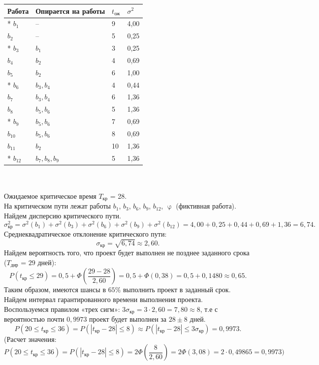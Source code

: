 \documentclass[a4paper, 12pt]{report}
\renewcommand{\leq}{\leqslant}
\renewcommand{\varphi}{\upvarphi}
\begin{document}
	\begin{tabular}{ |p{3cm}||p{4cm}||p{1cm}||p{1cm}|}
		\hline
		Работа & Опирается на работы & $t_\text{ож}$ & $\sigma^2$\\
		\hline
		* $b_1$ & -- & 9 & 4,00\\
		\;\;\;$b_2$ & --  & 5 &  0,25\\
		* $b_3$ & $b_1$ & 3 & 0,25\\
		\;\;\;$b_4$ & $b_2$ & 4 & 0,69\\
		\;\;\;$b_5$ & $b_2$ & 6 & 1,00\\
		* $b_6$ & $b_3,b_4$& 4  & 0,44\\
		\;\;\;$b_7$ & $b_3,b_4$ & 6 & 1,36\\
		\;\;\;$b_8$ & $b_5,b_6$ & 5 & 1,36\\
		* $b_9$ & $b_5,b_6$  & 7 & 0,69\\
		\;\;\;$b_{10}$ & $b_5,b_6$  & 8 & 0,69\\
		\;\;\;$b_{11}$ & $b_2$ & 10 &  1,36\\
		* $b_{12}$ & $b_7,b_8,b_9$ & 5 & 1,36\\
		\hline
	\end{tabular}\\\\
	Ожидаемое критическое время $T_\text{кр}$ = 28.\\
	На критическом пути лежат работы $b_1$, $b_3$, $b_6$, $b_9$, $b_{12}$, $\varphi$ (фиктивная работа).\\
	Найдем дисперсию критического пути.
	$$\sigma^2_\text{кр}=\sigma^2(b_1)+\sigma^2(b_3)+\sigma^2(b_6)+\sigma^2(b_9)+\sigma^2(b_{12})=4,00+0,25+0,44+0,69+1,36=6,74.$$
	Среднеквадратическое отклонение критического пути:
	$$\sigma_\text{кр}=\sqrt{6,74}\approx 2,60.$$
	Найдем вероятность того, что проект будет выполнен не позднее
	заданного срока ($T_\text{дир}$ = $29$ дней):
	$$P(t_\text{кр}\leq 29)=0,5+\Phi\left(\frac{29-28}{2,60}\right)=0,5+\Phi(0,38)=0,5+0,1480\approx 0,65.$$
	Таким образом, имеются шансы в $65\%$ выполнить проект в заданный срок.\\
	Найдем интервал гарантированного времени выполнения проекта.\\
	Воспользуемся правилом «трех сигм»: $3\sigma_\text{кр} = 3\cdot 2,60=7,80\approx 8$, т.е с вероятностью почти $0,9973$ проект будет выполнен за $28\pm 8$ дней.
	$$P(20\leq t_\text{кр}\leq 36)=P(|t_\text{кр}-28|\leq 8)\approx P(|t_\text{кр}-28|\leq 3\sigma_\text{кр})=0,9973.$$
	(Расчет значения:
	$$P(20\leq t_\text{кр}\leq 36)=P(|t_\text{кр}-28|\leq 8)=2\Phi(\frac{8}{2,60})=2\Phi(3,08)=2\cdot0,49865=0,9973)$$ 
\end{document}
